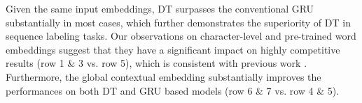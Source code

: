 \documentclass[11pt,a4paper]{article}
\begin{document}
Given the same input embeddings, DT surpasses the conventional GRU substantially in most cases, which further demonstrates the superiority of DT in sequence labeling tasks.
Our observations on character-level and pre-trained word embeddings suggest that they have a significant impact on highly competitive results (row 1 \& 3 vs. row 5), which is consistent with previous work \cite{first_CNN,char-LSTM+BLSTM+CRF}. 
Furthermore, the global contextual embedding substantially improves the performances on both DT and GRU based models (row 6 \& 7 vs. row 4 \& 5).

\begin{table}[t!]
\begin{center}
\end{center}
\caption{Ablation experiments on the CoNLL03 to investigate the impacts of various components, where ``char" indicates character-aware word embeddings, ``Glove" indicates pre-trained word embeddings, and ``global" indicates global contextual embedding.}
\label{quantiative investigation}
\end{table}
\end{document}
